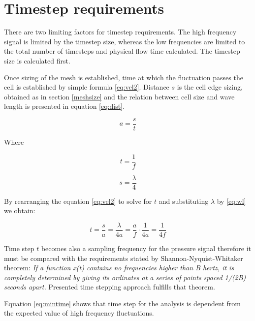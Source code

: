 \section{Timestep requirements} \label{timestepsize}
There are two limiting factors for timestep requirements. The high frequency signal is limited by the timestep size, whereas the low frequencies are limited to the total number of timesteps and physical flow time calculated. The timestep size is calculated first.

Once sizing of the mesh is established, time at which the fluctuation passes the cell is established by simple formula \ref{eq:vel2}. Distance $s$ is the cell edge sizing, obtained as in section \ref{meshsize} and the relation between cell size and wave length is presented in equation \ref{eq:dist}.

\begin{equation} \label{eq:vel2}
a = \frac{s}{t}
\end{equation}

Where

\begin{equation} \label{eq:time}
t = \frac{1}{f}
\end{equation}

\begin{equation} \label{eq:dist}
s = \frac{\lambda}{4}
\end{equation}

By rearranging the equation \ref{eq:vel2} to solve for $t$ and substituting $\lambda$ by \ref{eq:wl} we obtain:

\begin{equation} \label{eq:mintime}
t = \frac{s}{a} = \frac{\lambda}{4a} = \frac{a}{f} \cdot \frac{1}{4a} = \frac{1}{4f}
\end{equation}

Time step $t$ becomes also a sampling frequency for the pressure signal therefore it must be compared with the requirements stated by Shannon-Nyquist-Whitaker theorem: \textit{If a function x(t) contains no frequencies higher than B hertz, it is completely determined by giving its ordinates at a series of points spaced 1/(2B) seconds apart.} Presented time stepping approach fulfills that theorem.

Equation \ref{eq:mintime} shows that time step for the analysis is dependent from the expected value of high frequency fluctuations. %


